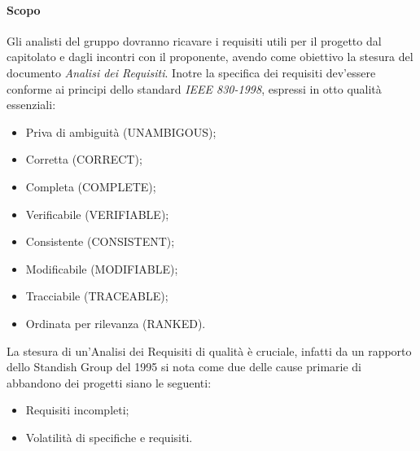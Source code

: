 			\paragraph*{Scopo}
				Gli analisti del gruppo dovranno ricavare i requisiti utili per il progetto
				dal capitolato e dagli incontri con il proponente, avendo come obiettivo la
				stesura del documento \textit{Analisi dei Requisiti}.
			        Inotre la specifica dei requisiti dev'essere conforme ai principi dello standard \textit{IEEE 830-1998}, espressi in otto qualit\`a
			        essenziali:
				\begin{itemize}
				\item Priva di ambiguit\`a (UNAMBIGOUS);
				\item Corretta (CORRECT);
				\item Completa (COMPLETE);
				\item Verificabile (VERIFIABLE);
				\item Consistente (CONSISTENT);
				\item Modificabile (MODIFIABLE);
				\item Tracciabile (TRACEABLE);
				\item Ordinata per rilevanza (RANKED).
				\end{itemize}
			        La stesura di un'Analisi dei Requisiti di qualit\`a \`e cruciale, infatti
			        da un rapporto dello Standish Group del 1995 si nota come due delle cause primarie
			        di abbandono dei progetti siano le seguenti:
				\begin{itemize}
				\item Requisiti incompleti;
				\item Volatilità di specifiche e requisiti.
				\end{itemize}
			
			
